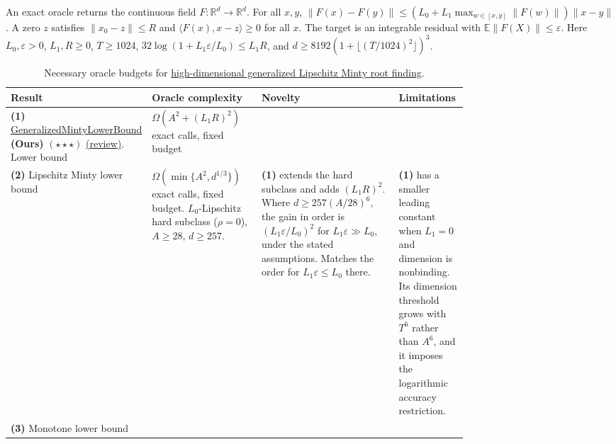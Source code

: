 \begin{table}[tp]
\centering
\caption{Necessary oracle budgets for \href{https://github.com/k3nfalt/longtails/blob/main/LongTails/Setups/HighDimensionalGeneralizedMinty.lean}{high-dimensional generalized Lipschitz Minty root finding}.}\label{tab:HighDimensionalGeneralizedMinty}
\parbox{\linewidth}{\footnotesize An exact oracle returns the continuous field $F\colon\mathbb R^d\to\mathbb R^d$. For all $x,y$, $\|F(x)-F(y)\|\le (L_0+L_1\max_{w\in[x,y]}\|F(w)\|)\|x-y\|$. A zero $z$ satisfies $\|x_0-z\|\le R$ and $\langle F(x),x-z\rangle\ge0$ for all $x$. The target is an integrable residual with $\mathbb E\|F(X)\|\le\varepsilon$. Here $L_0,\varepsilon>0$, $L_1,R\ge0$, $T\ge1024$, $32\log(1+L_1\varepsilon/L_0)\le L_1R$, and $d\ge8192(1+\lfloor(T/1024)^2\rfloor)^3$.}\par\smallskip
\begin{threeparttable}
\footnotesize
\setlength{\tabcolsep}{4pt}\renewcommand{\arraystretch}{1.25}
\begin{tabularx}{\linewidth}{@{}>{\raggedright\arraybackslash}p{0.21\linewidth}>{\raggedright\arraybackslash}p{0.24\linewidth}>{\raggedright\arraybackslash}p{0.30\linewidth}>{\raggedright\arraybackslash}X@{}}
\toprule
\textbf{Result} & \textbf{Oracle complexity} & \textbf{Novelty} & \textbf{Limitations} \\
\midrule
\textbf{(1)} \href{https://github.com/k3nfalt/longtails/blob/main/LongTails/Theorems/GeneralizedMintyLowerBound.lean}{Generalized\allowbreak{}Minty\allowbreak{}Lower\allowbreak{}Bound} \textbf{(Ours)} $(\star\star\star)$ \href{https://github.com/k3nfalt/longtails/blob/main/scripts/reviews/GeneralizedMintyLowerBound.md}{(review)}. Lower bound
& $\Omega(A^2+(L_1R)^2)$ exact calls, fixed budget
& & \\
\midrule[1.2pt]
\textbf{(2)} Lipschitz Minty lower bound \citep{hdwmEuclidean2026}
& $\Omega(\min\{A^2,d^{1/3}\})$ exact calls, fixed budget. $L_0$-Lipschitz hard subclass ($\rho=0$), $A\ge28$, $d\ge257$.
& \textbf{(1)} extends the hard subclass and adds $(L_1R)^2$. Where $d\ge257(A/28)^6$, the gain in order is $(L_1\varepsilon/L_0)^2$ for $L_1\varepsilon\gg L_0$, under the stated assumptions. Matches the order for $L_1\varepsilon\le L_0$ there.
& \textbf{(1)} has a smaller leading constant when $L_1=0$ and dimension is nonbinding. Its dimension threshold grows with $T^6$ rather than $A^6$, and it imposes the logarithmic accuracy restriction. \\
\midrule
\textbf{(3)} Monotone lower bound \citep[Thm.~2.8]{hdgmRudomanov2026v1}

\end{tabularx}
\end{threeparttable}
\end{table}

